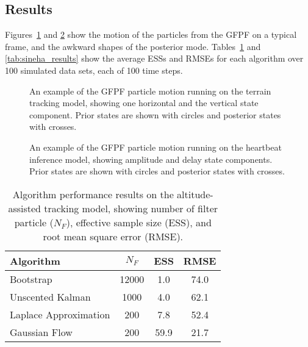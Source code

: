 \documentclass{article}
\begin{document}
\subsection{Results}

Figures~\ref{fig:drone_example_frame_deterministic} and \ref{fig:sineha_example_frame} show the motion of the particles from the GFPF on a typical frame, and the awkward shapes of the posterior mode. Tables~\ref{tab:drone_results} and \ref{tab:sineha_results} show the average ESSs and RMSEs for each algorithm over 100 simulated data sets, each of 100 time steps.

\begin{figure}
\centering

\caption{An example of the GFPF particle motion running on the terrain tracking model, showing one horizontal and the vertical state component. Prior states are shown with circles and posterior states with crosses.}
\label{fig:drone_example_frame_deterministic}
\end{figure}

\begin{figure}
\centering

\caption{An example of the GFPF particle motion running on the heartbeat inference model, showing amplitude and delay state components. Prior states are shown with circles and posterior states with crosses.}
\label{fig:sineha_example_frame}
\end{figure}

\begin{table}
\centering
\begin{tabular}{l||c|c|c}
Algorithm                                & $N_F$  & ESS  & RMSE \\
\hline
Bootstrap                                &  12000 & 1.0  & 74.0 \\
Unscented Kalman                         &   1000 & 4.0  & 62.1 \\
Laplace Approximation                    &    200 & 7.8  & 52.4 \\
Gaussian Flow                            &    200 & 59.9 & 21.7 \\
\end{tabular}
\caption{Algorithm performance results on the altitude-assisted tracking model, showing number of filter particle ($N_F$), effective sample size (ESS), and root mean square error (RMSE).}
\label{tab:drone_results}
\end{table}
\end{document}
